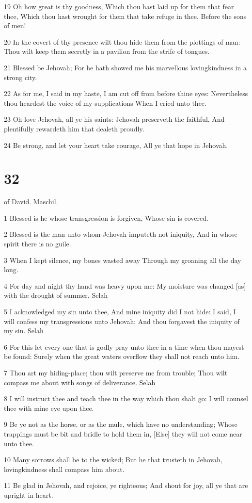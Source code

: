 \par 19 Oh how great is thy goodness, Which thou hast laid up for them that fear thee, Which thou hast wrought for them that take refuge in thee, Before the sons of men!
\par 20 In the covert of thy presence wilt thou hide them from the plottings of man: Thou wilt keep them secretly in a pavilion from the strife of tongues.
\par 21 Blessed be Jehovah; For he hath showed me his marvellous lovingkindness in a strong city.
\par 22 As for me, I said in my haste, I am cut off from before thine eyes: Nevertheless thou heardest the voice of my supplications When I cried unto thee.
\par 23 Oh love Jehovah, all ye his saints: Jehovah preserveth the faithful, And plentifully rewardeth him that dealeth proudly.
\par 24 Be strong, and let your heart take courage, All ye that hope in Jehovah.

\chapter{32}

\par [A Psalm] of David. Maschil.

\par 1 Blessed is he whose transgression is forgiven, Whose sin is covered.
\par 2 Blessed is the man unto whom Jehovah imputeth not iniquity, And in whose spirit there is no guile.
\par 3 When I kept silence, my bones wasted away Through my groaning all the day long.
\par 4 For day and night thy hand was heavy upon me: My moisture was changed [as] with the drought of summer. Selah
\par 5 I acknowledged my sin unto thee, And mine iniquity did I not hide: I said, I will confess my transgressions unto Jehovah; And thou forgavest the iniquity of my sin. Selah
\par 6 For this let every one that is godly pray unto thee in a time when thou mayest be found: Surely when the great waters overflow they shall not reach unto him.
\par 7 Thou art my hiding-place; thou wilt preserve me from trouble; Thou wilt compass me about with songs of deliverance. Selah
\par 8 I will instruct thee and teach thee in the way which thou shalt go: I will counsel thee with mine eye upon thee.
\par 9 Be ye not as the horse, or as the mule, which have no understanding; Whose trappings must be bit and bridle to hold them in, [Else] they will not come near unto thee.
\par 10 Many sorrows shall be to the wicked; But he that trusteth in Jehovah, lovingkindness shall compass him about.
\par 11 Be glad in Jehovah, and rejoice, ye righteous; And shout for joy, all ye that are upright in heart.

